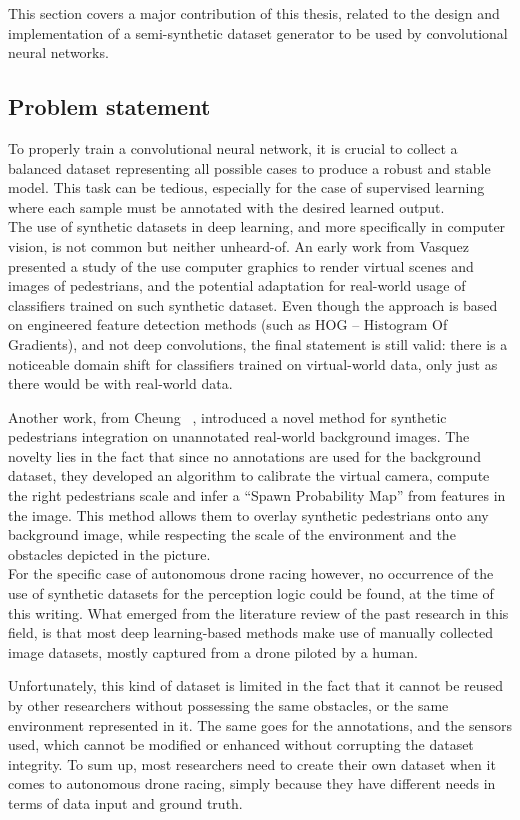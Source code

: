 This section covers a major contribution of this thesis, related to the design
and implementation of a semi-synthetic dataset generator to be used by
convolutional neural networks.

\subsection{Problem statement}

To properly train a convolutional neural network, it is crucial to collect a
balanced dataset representing all possible cases to produce a robust and
stable model. This task can be tedious, especially for the case of supervised
learning where each sample must be annotated with the desired learned output.\\

The use of synthetic datasets in deep learning, and more specifically in
computer vision, is not common but neither unheard-of. An early work from
Vasquez \etal~\cite{PedestrianDetection} presented a study of the use computer
graphics to render virtual scenes and images of pedestrians, and the potential
adaptation for real-world usage of classifiers trained on such synthetic
dataset. Even though the approach is based on engineered feature detection
methods (such as HOG -- Histogram Of Gradients), and not deep convolutions, the
final statement is still valid: there is a noticeable domain shift for
classifiers trained on virtual-world data, only just as there would be with
real-world data.

Another work, from Cheung \etal~\cite{CheungWBM17}, introduced a novel method
for synthetic pedestrians integration on unannotated real-world background
images. The novelty lies in the fact that since no annotations are used for the
background dataset, they developed an algorithm to calibrate the virtual
camera, compute the right pedestrians scale and infer a ``Spawn Probability
Map'' from features in the image. This method allows them to overlay synthetic
pedestrians onto any background image, while respecting the scale of the
environment and the obstacles depicted in the picture.\\


For the specific case of autonomous drone racing however, no occurrence of the
use of synthetic datasets for the perception logic could be found, at the time
of this writing. What emerged from the literature review of the past research
in this field, is that most deep learning-based methods make use of manually
collected image datasets, mostly captured from a drone piloted by a human.

Unfortunately, this kind of dataset is limited in the fact that it cannot be
reused by other researchers without possessing the same obstacles, or the same
environment represented in it. The same goes for the annotations, and the
sensors used, which cannot be modified or enhanced without corrupting the
dataset integrity. To sum up, most researchers need to create their own dataset
when it comes to autonomous drone racing, simply because they have different
needs in terms of data input and ground truth.\\

